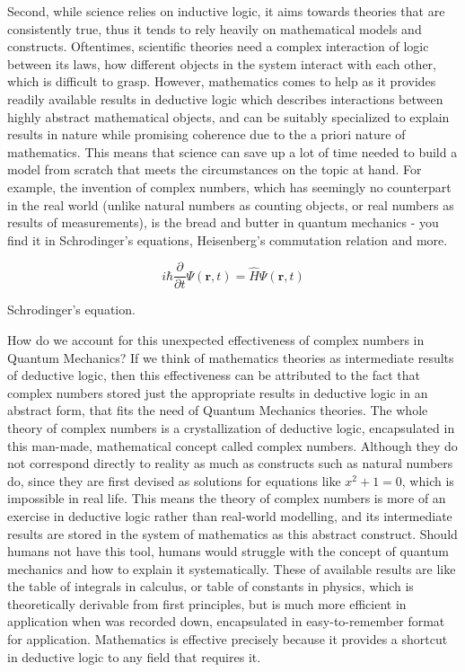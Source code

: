 \documentclass[a4paper]{article}
\newcommand{\0}{\{\}}
\newcommand{\1}{\{\0\}}
\newcommand{\2}{\{\0,\1\}}
\newcommand{\3}{\{\0,\1,\2\}}
\newcommand{\4}{\{\0,\1,\2,\3\}}
\newcommand{\5}{\{\0,\1,\2,\3,\4\}}
\begin{document}
Second, while science relies on inductive logic, it aims towards theories that
are consistently true, thus it tends to rely heavily on mathematical models and
constructs. Oftentimes, scientific theories need a complex interaction of logic
between its laws, how different objects in the system interact with each other,
which is difficult to grasp. However, mathematics comes to help as it provides
readily available results in deductive logic which describes interactions
between highly abstract mathematical objects, and can be suitably specialized to
explain results in nature while promising coherence due to the a priori nature
of mathematics. This means that science can save up a lot of time needed to
build a model from scratch that meets the circumstances on the topic at hand.
For example, the invention of complex numbers, which has seemingly no
counterpart in the real world (unlike natural numbers as counting objects, or
real numbers as results of measurements), is the bread and butter in quantum
mechanics - you find it in Schrodinger’s equations, Heisenberg’s commutation
relation and more.

\[i \hbar \frac{\partial}{\partial t}\Psi(\mathbf{r},t) = \hat H \Psi(\mathbf{r},t)\]
\begin{center}
Schrodinger's equation.
\end{center}

How do we account for this unexpected effectiveness of complex numbers in
Quantum Mechanics? If we think of mathematics theories as intermediate results
of deductive logic, then this effectiveness can be attributed to the fact that
complex numbers stored just the appropriate results in deductive logic in an
abstract form, that fits the need of Quantum Mechanics theories. The whole
theory of complex numbers is a crystallization of deductive logic, encapsulated
in this man-made, mathematical concept called complex numbers. Although they do
not correspond directly to reality as much as constructs such as natural numbers
do, since they are first devised as solutions for equations like $x^{2}+1=0$, which
is impossible in real life. This means the theory of complex numbers is more of
an exercise in deductive logic rather than real-world modelling, and its
intermediate results are stored in the system of mathematics as this abstract
construct. Should humans not have this tool, humans would struggle with the
concept of quantum mechanics and how to explain it systematically. These of
available results are like the table of integrals in calculus, or table of
constants in physics, which is theoretically derivable from first principles,
but is much more efficient in application when was recorded down, encapsulated
in easy-to-remember format for application. Mathematics is effective precisely
because it provides a shortcut in deductive logic to any field that requires it.
\end{document}
